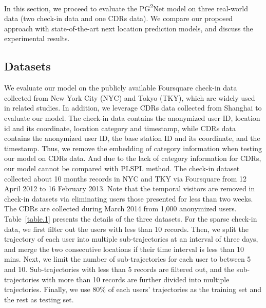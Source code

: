\documentclass[10pt,journal,compsoc]{IEEEtran}
\begin{document}
In this section, we proceed to evaluate the PG\textsuperscript{2}Net model on three real-world data (two check-in data and one CDRs data). We compare our proposed approach with state-of-the-art next location prediction models, and discuss the experimental results.

\subsection{\textbf{Datasets}}
We evaluate our model on the publicly available Foursquare check-in data collected from New York City (NYC) and Tokyo (TKY), which are widely used in related studies. In addition, we leverage CDRs data collected from Shanghai to evaluate our model. The check-in data contains the anonymized user ID, location id and its coordinate, location category and timestamp, while CDRs data contains the anonymized user ID, the base station ID and its coordinate, and the timestamp. Thus, we remove the embedding of category information when testing our model on CDRs data. And due to the lack of category information for CDRs, our model cannot be compared with PLSPL method. The check-in dataset collected about 10 months records in NYC and TKY via Foursquare from 12 April 2012 to 16 February 2013. Note that the temporal visitors are removed in check-in datasets via eliminating users those presented for less than two weeks. The CDRs are collected during March 2014 from 1,000 anonymized users. Table~\ref{table.1} presents the details of the three datasets. For the sparse check-in data, we first filter out the users with less than 10 records. Then, we split the trajectory of each user into multiple sub-trajectories at an interval of three days, and merge the two consecutive locations if their time interval is less than 10 mins. Next, we limit the number of sub-trajectories for each user to between 5 and 10. Sub-trajectories with less than 5 records are filtered out, and the sub-trajectories with more than 10 records are further divided into multiple trajectories. Finally, we use 80\% of each users' trajectories as the training set and the rest as testing set.

\begin{table}[htpb]
\centering
\caption{Statistics of the evaluation datasets.}
\label{table.1}
\end{table}
\end{document}
